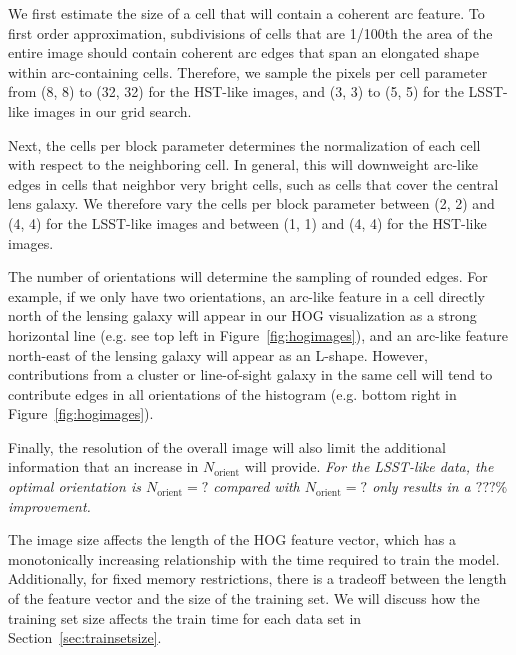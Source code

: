 \documentclass{emulateapj}
\newcommand{\wording}[1]{{\it\color{purple} #1}}
\begin{document}
We first estimate the size of a cell that will contain a coherent arc
feature.  To first order approximation, subdivisions of cells that are
1/100th the area of the entire image should contain coherent arc edges
that span an elongated shape within arc-containing cells.  Therefore,
we sample the pixels per cell parameter from (8, 8) to (32, 32) for
the HST-like images, and (3, 3) to (5, 5) for the LSST-like images in
our grid search.

Next, the cells per block parameter determines the normalization of
each cell with respect to the neighboring cell.  In general, this will
downweight arc-like edges in cells that neighbor very bright cells,
such as cells that cover the central lens galaxy.  We therefore vary
the cells per block parameter between (2, 2) and (4, 4) for the
LSST-like images and between (1, 1) and (4, 4) for the HST-like
images.

The number of orientations will determine the sampling of rounded
edges.  For example, if we only have two orientations, an arc-like
feature in a cell directly north of the lensing galaxy will appear in
our HOG visualization as a strong horizontal line (e.g. see top left
in Figure~\ref{fig:hogimages}), and an arc-like feature north-east of
the lensing galaxy will appear as an L-shape.  However, contributions
from a cluster or line-of-sight galaxy in the same cell will tend to
contribute edges in all orientations of the histogram (e.g. bottom
right in Figure~\ref{fig:hogimages}).  

Finally, the resolution of the overall image will also limit the
additional information that an increase in $N_\text{orient}$ will
provide.  \wording{For the LSST-like data, the optimal orientation is
  $N_\text{orient}=?$ compared with $N_\text{orient}=?$ only results
  in a $???\%$ improvement.}

The image size affects the length of the HOG feature vector, which has
a monotonically increasing relationship with the time required to
train the model.  Additionally, for fixed memory restrictions, there
is a tradeoff between the length of the feature vector and the size of
the training set.  We will discuss how the training set size affects
the train time for each data set in Section~\ref{sec:trainsetsize}.
\end{document}
